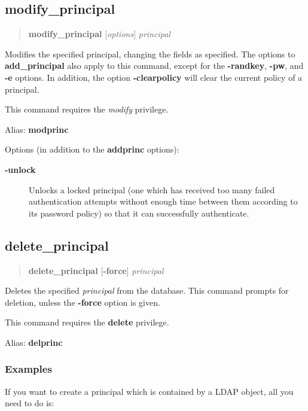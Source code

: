 \documentclass[letterpaper,10pt,english]{sphinxmanual}
\begin{document}
\subsection{modify\_principal}
\label{admin/database:modify-principal}\begin{quote}

\textbf{modify\_principal} {[}\emph{options}{]} \emph{principal}
\end{quote}

Modifies the specified principal, changing the fields as specified.
The options to \textbf{add\_principal} also apply to this command, except
for the \textbf{-randkey}, \textbf{-pw}, and \textbf{-e} options.  In addition, the
option \textbf{-clearpolicy} will clear the current policy of a principal.

This command requires the \emph{modify} privilege.

Alias: \textbf{modprinc}

Options (in addition to the \textbf{addprinc} options):
\begin{description}
\item[{\textbf{-unlock}}] \leavevmode
Unlocks a locked principal (one which has received too many failed
authentication attempts without enough time between them according
to its password policy) so that it can successfully authenticate.

\end{description}


\subsection{delete\_principal}
\label{admin/database:delete-principal}\begin{quote}

\textbf{delete\_principal} {[}\textbf{-force}{]} \emph{principal}
\end{quote}

Deletes the specified \emph{principal} from the database.  This command
prompts for deletion, unless the \textbf{-force} option is given.

This command requires the \textbf{delete} privilege.

Alias: \textbf{delprinc}


\subsubsection{Examples}
\label{admin/database:examples}
If you want to create a principal which is contained by a LDAP object,
all you need to do is:
\end{document}
